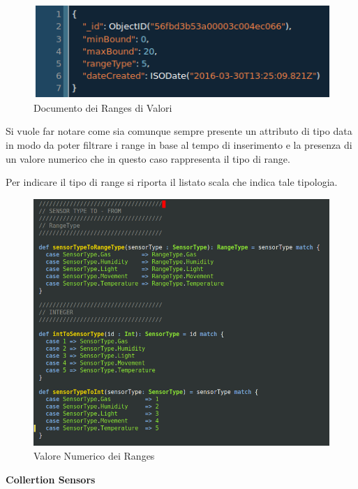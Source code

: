 \begin{figure}[ht]
\centering
\includegraphics[width=\textwidth,natwidth=610,natheight=642]{Figures/DataStructures/RangesValues.png}
\caption{Documento dei Ranges di Valori}
\end{figure}

Si vuole far notare come sia comunque sempre presente un attributo di tipo data in modo da poter filtrare i range in base al tempo di inserimento e la presenza di un valore numerico che in questo caso rappresenta il tipo di range.

Per indicare il tipo di range si riporta il listato scala che indica tale tipologia.

\begin{figure}[ht]
\centering
\includegraphics[scale=0.5,natwidth=610,natheight=642]{Figures/DataStructures/Ranges.png}
\caption{Valore Numerico dei Ranges}
\end{figure}

\begin{center}
  \textbf{Collertion Sensors}
\end{center}

